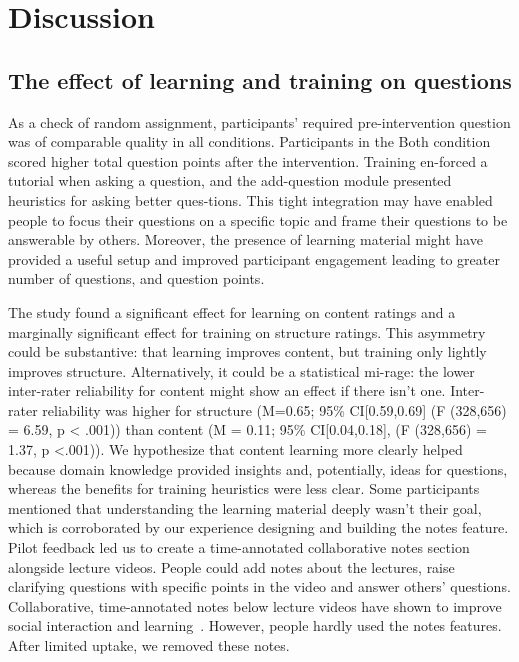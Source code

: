 \section{Discussion}
\subsection{The effect of learning and training on questions}
As a check of random assignment, participants’ required pre-intervention question was of comparable quality in all conditions. Participants in the Both condition scored higher total question points after the intervention. Training en-forced a tutorial when asking a question, and the add-question module presented heuristics for asking better ques-tions. This tight integration may have enabled people to focus their questions on a specific topic and frame their questions to be answerable by others. Moreover, the presence of learning material might have provided a useful setup and improved participant engagement leading to greater number of questions, and question points.

The study found a significant effect for learning on content ratings and a marginally significant effect for training on structure ratings. This asymmetry could be substantive: that learning improves content, but training only lightly improves structure. Alternatively, it could be a statistical mi-rage: the lower inter-rater reliability for content might show an effect if there isn’t one. Inter-rater reliability was higher for structure (M=0.65; 95\% CI[0.59,0.69] (F (328,656) = 6.59, p < .001)) than content (M = 0.11; 95\% CI[0.04,0.18], (F (328,656) = 1.37, p <.001)).
We hypothesize that content learning more clearly helped because domain knowledge provided insights and, potentially, ideas for questions, whereas the benefits for training heuristics were less clear. Some participants mentioned that understanding the learning material deeply wasn’t their goal, which is corroborated by our experience designing and building the notes feature. Pilot feedback led us to create a time-annotated collaborative notes section alongside lecture videos. People could add notes about the lectures, raise clarifying questions with specific points in the video and answer others’ questions. Collaborative, time-annotated notes below lecture videos have shown to improve social interaction and learning~\cite{Lee2015}. However, people hardly used the notes features. After limited uptake, we removed these notes.

